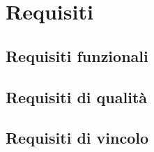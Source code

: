 \section{Requisiti}
	\subsection{Requisiti funzionali}
		
	\subsection{Requisiti di qualità}
	\subsection{Requisiti di vincolo}
